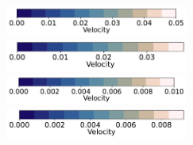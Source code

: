 \documentclass[12pt]{article}
\numberwithin{equation}{subsection}
\begin{document}
\begin{figure}[!htb]
\begin{multicols}{4}
	\end{multicols}
	\vspace{-0.3in}
	\begin{multicols}{4}
		\hspace{0.2in} \includegraphics[width=6cm]{./case1/v_ana_cbhorz.pdf}\par
		\hspace{0.95in} \includegraphics[width=6cm]{./case2/v_ana_cbhorz.pdf}\par
		\hspace{1.8in} \includegraphics[width=6cm]{./case3/v_ana_cbhorz.pdf}\par
		\hspace{2.45in} \includegraphics[width=6cm]{./case4/v_ana_cbhorz.pdf}
	\end{multicols}
	

\end{figure}
\end{document}
